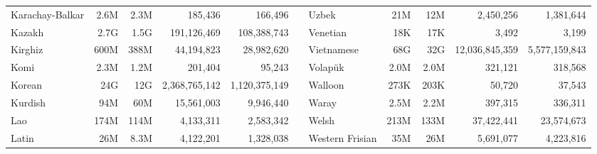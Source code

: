 \begin{table*}[t!]
\begin{tabular}{lrrrrclrrrr}
        Karachay-Balkar           & 2.6M                     & 2.3M                      & 185,436                  & 166,496                   &                          & Uzbek                     & 21M                      & 12M                       & 2,450,256                & 1,381,644                 \\
        Kazakh                    & 2.7G                     & 1.5G                      & 191,126,469              & 108,388,743               &                          & Venetian                  & 18K                      & 17K                       & 3,492                    & 3,199                     \\
        Kirghiz                   & 600M                     & 388M                      & 44,194,823               & 28,982,620                &                          & Vietnamese                & 68G                      & 32G                       & 12,036,845,359           & 5,577,159,843             \\
        Komi                      & 2.3M                     & 1.2M                      & 201,404                  & 95,243                    &                          & Volapük                   & 2.0M                     & 2.0M                      & 321,121                  & 318,568                   \\
        Korean                    & 24G                      & 12G                       & 2,368,765,142            & 1,120,375,149             &                          & Walloon                   & 273K                     & 203K                      & 50,720                   & 37,543                    \\
        Kurdish                   & 94M                      & 60M                       & 15,561,003               & 9,946,440                 &                          & Waray                     & 2.5M                     & 2.2M                      & 397,315                  & 336,311                   \\
        Lao                       & 174M                     & 114M                      & 4,133,311                & 2,583,342                 &                          & Welsh                     & 213M                     & 133M                      & 37,422,441               & 23,574,673                \\
        Latin                     & 26M                      & 8.3M                      & 4,122,201                & 1,328,038                 &                          & Western Frisian           & 35M                      & 26M                       & 5,691,077                & 4,223,816                 \\

\end{tabular}
\end{table*}
